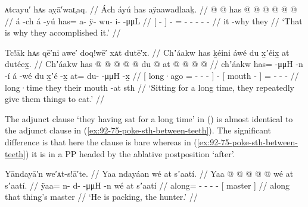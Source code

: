 \ex\label{ex:92-115-thats-why-accomplished}%
%
\begingl
	\glpreamble	ᴀtcayu′ hᴀs aỵā′waʟ̣aq. //
	\glpreamble	Ách áyú has aÿaawadlaaḵ. //
	\gla	{}  @ {} {}  @ {}
		has @  @ {} @ {} @ {} @ {} @ {} //
	\glb	{} á -ch {} á -yú
		has= a- ÿ- wu- i-  -μμL //
	\glc	{}[  - {}]  -
		= - - - -  - //
	\gld	{} it -why {}  {}
		they  {} {} {} {} {} //
	\glft	‘That is why they accomplished it.’
		//
\endgl
\xe

\ex\label{ex:92-116-ppl-give-things-to-eat}%
%
\begingl
	\glpreamble	Tc!āk hᴀs qē′ni awe′ doq!wē′ xᴀt dutē′x. //
	\glpreamble	Chʼáakw has ḵéini áwé du x̱ʼéix̱ at dutéex̱. //
	\gla	{} Chʼáakw has @  @ {} @ {} @ {} {}  @ {}
		{} du  @ {} {}
		at @  @ {} @ {} @ {} //
	\glb	{} chʼáakw has=  -μμH -n -í {} á -wé 
		{} du x̱ʼé -x̱ {}
		at= du-  -μμH -x̱ //
	\glc	{}[ long·ago =  -
			- - {}]  -
		{}[  mouth - {}]
		= -  - - //
	\gld	{} long·time they  {} {} {} {}
			 {}
		{} their mouth -at {}
		sth\•  {} {} {} //
	\glft	‘Sitting for a long time, they repeatedly give them things to eat.’
		//
\endgl
\xe

The adjunct clause  ‘they having sat for a long time’ in (\lastx) is almost identical to the adjunct clause in (\ref{ex:92-75-poke-sth-between-teeth}).
The significant difference is that here the clause is bare whereas in (\ref{ex:92-75-poke-sth-between-teeth}) it is in a PP headed by the ablative postposition  ‘after’.

\ex\label{ex:92-117-packing-hunter}%
%
\begingl
	\glpreamble	Yāndayā′n we′ᴀt-s!ā′te. //
	\glpreamble	Yaa ndayáan wé at sʼaatí. //
	\gla	Yaa @  @ {} @ {} @ {} @ {}
		{} wé at sʼaatí. {} //
	\glb	ÿaa= n- d-  -μμH -n
		{} wé at sʼaatí {} //
	\glc	along= - -  - -
		{}[   master {}] //
	\gld	along  {} {} {} {}
		{} that thing’s master {}  //
	\glft	‘He is packing, the hunter.’
		//
\endgl
\xe

